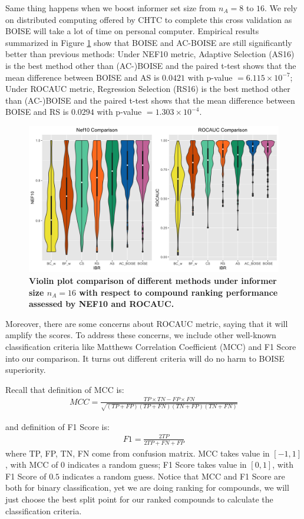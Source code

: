 \documentclass[12pt]{article}
\begin{document}
Same thing happens when we boost informer set size from $n_A = 8$ to $16$. We rely on distributed computing offered by CHTC to complete this cross validation as BOISE will take a lot of time on personal computer. Empirical results summarized in Figure \ref{fig:pkis16} show that BOISE and AC-BOISE are still significantly better than previous methods: Under NEF10 metric, Adaptive Selection (AS16) is the best method other than (AC-)BOISE and the paired t-test shows that the mean difference between BOISE and AS is $0.0421$ with p-value $=6.115\times 10^{-7}$;  Under ROCAUC metric, Regression Selection (RS16) is the best method other than (AC-)BOISE and the paired t-test shows that the mean difference between BOISE and RS is $0.0294$ with p-value $=1.303\times 10^{-4}$. 
\begin{figure}[!ht]
\centering
\includegraphics[width=5.0in]{PKIS1_16_eval.png}
\caption{\label{fig:pkis16} 
{\bf Violin plot comparison of different methods under informer size $n_A =16$ with respect to compound ranking performance assessed by NEF10 and ROCAUC.}}
\end{figure}

Moreover, there are some concerns about ROCAUC metric, saying that it will amplify the scores. To address these concerns, we include other well-known classification criteria like Matthews Correlation Coefficient (MCC) and F1 Score into our comparison. It turns out different criteria will do no harm to BOISE superiority. 

Recall that definition of MCC is:
\begin{eqnarray}
\label{eq:mcc}
MCC = \frac{TP\times TN-FP\times FN}{\sqrt{(TP+FP)(TP+FN)(TN+FP)(TN+FN)}}
\end{eqnarray}

and definition of F1 Score is:
\begin{eqnarray}
\label{eq:F1}
F1 = \frac{2TP}{2TP+FN+FP}
\end{eqnarray}
where TP, FP, TN, FN come from confusion matrix. MCC takes value in $[-1,1]$, with MCC of $0$ indicates a random guess; F1 Score takes value in $[0,1]$, with F1 Score of $0.5$ indicates a random guess. Notice that MCC and F1 Score are both for binary classification, yet we are doing ranking for compounds, we will just choose the best split point for our ranked compounds to calculate the classification criteria. 
\end{document}
